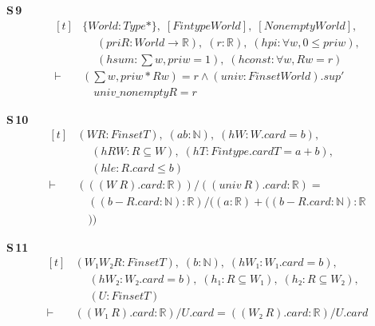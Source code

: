 \noindent\textbf{S\,9}\quad{}
{\footnotesize\[ \begin{aligned}[t]
&\{ \mathit{World} : \mathit{Type}*\},\; [\mathit{Fintype} \mathit{World}],\; [\mathit{Nonempty} \mathit{World}],\\
&\quad \; (\mathit{pri} \mathit{R} : \mathit{World} \to \mathbb{R} ),\; (\mathit{r} : \mathbb{R} ),\; (\mathit{hpi} : \forall \mathit{w}, 0 \leq \mathit{pri} \mathit{w}),\\
&\quad \; (\mathit{hsum} : \textstyle\sum \mathit{w}, \mathit{pri} \mathit{w} = 1),\; (\mathit{hconst} : \forall \mathit{w}, \mathit{R} \mathit{w} = \mathit{r})\\
\vdash\;&(\textstyle\sum \mathit{w}, \mathit{pri} \mathit{w} * \mathit{R} \mathit{w}) = \mathit{r} \wedge (\mathit{univ} : \mathit{Finset} \mathit{World}).\mathit{sup'}\\
&\quad \mathit{univ\_nonempty} \mathit{R} = \mathit{r}
\end{aligned} \]}

\noindent\textbf{S\,10}\quad{}
{\footnotesize\[ \begin{aligned}[t]
&(\mathit{W} \mathit{R} : \mathit{Finset} \mathit{T}),\; (\mathit{a} \mathit{b} : \mathbb{N} ),\; (\mathit{hW} : \mathit{W}.\mathit{card} = \mathit{b}),\\
&\quad \; (\mathit{hRW} : \mathit{R} \subseteq \mathit{W}),\; (\mathit{hT} : \mathit{Fintype}.\mathit{card} \mathit{T} = \mathit{a} + \mathit{b}),\\
&\quad \; (\mathit{hle} : \mathit{R}.\mathit{card} \leq \mathit{b})\\
\vdash\;&(((\mathit{W} \ \mathit{R}).\mathit{card} : \mathbb{R} )) / ((\mathit{univ} \ \mathit{R}).\mathit{card} : \mathbb{R} ) =\\
&\quad ((\mathit{b} - \mathit{R}.\mathit{card} : \mathbb{N} ) : \mathbb{R} ) / ((\mathit{a} : \mathbb{R} ) + ((\mathit{b} - \mathit{R}.\mathit{card} : \mathbb{N} ) : \mathbb{R}\\
&\quad ))
\end{aligned} \]}

\noindent\textbf{S\,11}\quad{}
{\footnotesize\[ \begin{aligned}[t]
&(\mathit{W₁} \mathit{W₂} \mathit{R} : \mathit{Finset} \mathit{T}),\; (\mathit{b} : \mathbb{N} ),\; (\mathit{hW₁} : \mathit{W₁}.\mathit{card} = \mathit{b}),\\
&\quad \; (\mathit{hW₂} : \mathit{W₂}.\mathit{card} = \mathit{b}),\; (\mathit{h₁} : \mathit{R} \subseteq \mathit{W₁}),\; (\mathit{h₂} : \mathit{R} \subseteq \mathit{W₂}),\\
&\quad \; (\mathit{U} : \mathit{Finset} \mathit{T})\\
\vdash\;&((\mathit{W₁} \ \mathit{R}).\mathit{card} : \mathbb{R} ) / \mathit{U}.\mathit{card} = ((\mathit{W₂} \ \mathit{R}).\mathit{card} : \mathbb{R} ) / \mathit{U}.\mathit{card}
\end{aligned} \]}

